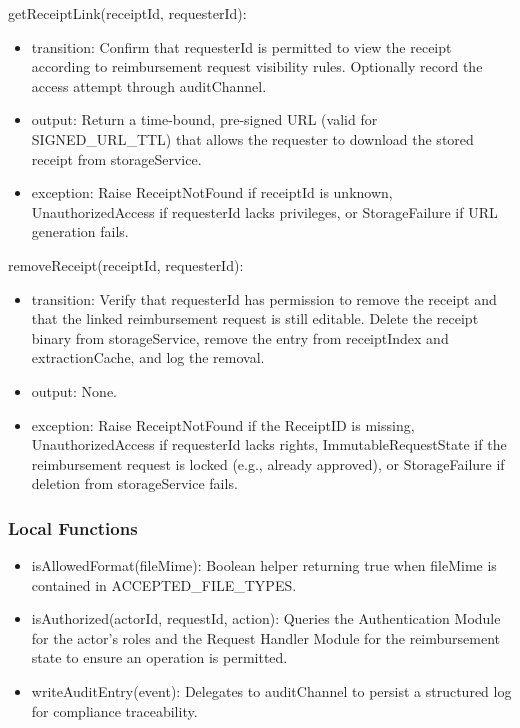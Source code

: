 \documentclass[12pt, titlepage]{article}
\begin{document}
\noindent getReceiptLink(receiptId, requesterId):
\begin{itemize}
  \item transition: Confirm that requesterId is permitted to view the receipt according to reimbursement request visibility rules. Optionally record the access attempt through auditChannel.
  \item output: Return a time-bound, pre-signed URL (valid for SIGNED\_URL\_TTL) that allows the requester to download the stored receipt from storageService.
  \item exception: Raise ReceiptNotFound if receiptId is unknown, UnauthorizedAccess if requesterId lacks privileges, or StorageFailure if URL generation fails.
\end{itemize}

\noindent removeReceipt(receiptId, requesterId):
\begin{itemize}
  \item transition: Verify that requesterId has permission to remove the receipt and that the linked reimbursement request is still editable. Delete the receipt binary from storageService, remove the entry from receiptIndex and extractionCache, and log the removal.
  \item output: None.
  \item exception: Raise ReceiptNotFound if the ReceiptID is missing, UnauthorizedAccess if requesterId lacks rights, ImmutableRequestState if the reimbursement request is locked (e.g., already approved), or StorageFailure if deletion from storageService fails.
\end{itemize}

\subsubsection{Local Functions}

\begin{itemize}
  \item isAllowedFormat(fileMime): Boolean helper returning true when fileMime is contained in ACCEPTED\_FILE\_TYPES.
  \item isAuthorized(actorId, requestId, action): Queries the Authentication Module for the actor's roles and the Request Handler Module for the reimbursement state to ensure an operation is permitted.
  \item writeAuditEntry(event): Delegates to auditChannel to persist a structured log for compliance traceability.
\end{itemize}
\end{document}

